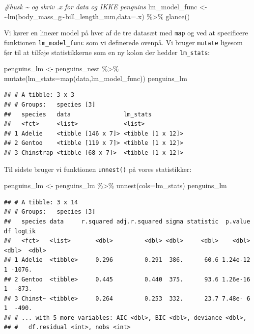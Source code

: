\documentclass[
]{book}
\newenvironment{Shaded}{\begin{snugshade}}{\end{snugshade}}
\newcommand{\AttributeTok}[1]{\textcolor[rgb]{0.77,0.63,0.00}{#1}}
\newcommand{\CommentTok}[1]{\textcolor[rgb]{0.56,0.35,0.01}{\textit{#1}}}
\newcommand{\ErrorTok}[1]{\textcolor[rgb]{0.64,0.00,0.00}{\textbf{#1}}}
\newcommand{\FunctionTok}[1]{\textcolor[rgb]{0.00,0.00,0.00}{#1}}
\newcommand{\NormalTok}[1]{#1}
\newcommand{\OtherTok}[1]{\textcolor[rgb]{0.56,0.35,0.01}{#1}}
\newcommand{\SpecialCharTok}[1]{\textcolor[rgb]{0.00,0.00,0.00}{#1}}
\begin{document}
\begin{Shaded}
\begin{Highlighting}[]
\CommentTok{\#husk \textasciitilde{} og skriv .x for data og IKKE penguins}
\NormalTok{lm\_model\_func }\OtherTok{\textless{}{-}} \ErrorTok{\textasciitilde{}}\FunctionTok{lm}\NormalTok{(body\_mass\_g}\SpecialCharTok{\textasciitilde{}}\NormalTok{bill\_length\_mm,}\AttributeTok{data=}\NormalTok{.x) }\SpecialCharTok{\%\textgreater{}\%} \FunctionTok{glance}\NormalTok{()}
\end{Highlighting}
\end{Shaded}

Vi kører en lineær model på hver af de tre datasæt med \texttt{map} og ved at specificere funktionen \texttt{lm\_model\_func} som vi definerede ovenpå. Vi bruger \texttt{mutate} ligesom før til at tilføje statistikkerne som en ny kolon der hedder \texttt{lm\_stats}:

\begin{Shaded}
\begin{Highlighting}[]
\NormalTok{penguins\_lm }\OtherTok{\textless{}{-}}\NormalTok{ penguins\_nest }\SpecialCharTok{\%\textgreater{}\%}
  \FunctionTok{mutate}\NormalTok{(}\AttributeTok{lm\_stats=}\FunctionTok{map}\NormalTok{(data,lm\_model\_func))}
\NormalTok{penguins\_lm}
\end{Highlighting}
\end{Shaded}

\begin{verbatim}
## # A tibble: 3 x 3
## # Groups:   species [3]
##   species   data               lm_stats         
##   <fct>     <list>             <list>           
## 1 Adelie    <tibble [146 x 7]> <tibble [1 x 12]>
## 2 Gentoo    <tibble [119 x 7]> <tibble [1 x 12]>
## 3 Chinstrap <tibble [68 x 7]>  <tibble [1 x 12]>
\end{verbatim}

Til sidste bruger vi funktionen \texttt{unnest()} på vores statistikker:

\begin{Shaded}
\begin{Highlighting}[]
\NormalTok{penguins\_lm }\OtherTok{\textless{}{-}}\NormalTok{ penguins\_lm }\SpecialCharTok{\%\textgreater{}\%}
  \FunctionTok{unnest}\NormalTok{(}\AttributeTok{cols=}\NormalTok{lm\_stats)}
\NormalTok{penguins\_lm}
\end{Highlighting}
\end{Shaded}

\begin{verbatim}
## # A tibble: 3 x 14
## # Groups:   species [3]
##   species data     r.squared adj.r.squared sigma statistic  p.value    df logLik
##   <fct>   <list>       <dbl>         <dbl> <dbl>     <dbl>    <dbl> <dbl>  <dbl>
## 1 Adelie  <tibble>     0.296         0.291  386.      60.6 1.24e-12     1 -1076.
## 2 Gentoo  <tibble>     0.445         0.440  375.      93.6 1.26e-16     1  -873.
## 3 Chinst~ <tibble>     0.264         0.253  332.      23.7 7.48e- 6     1  -490.
## # ... with 5 more variables: AIC <dbl>, BIC <dbl>, deviance <dbl>,
## #   df.residual <int>, nobs <int>
\end{verbatim}
\end{document}
